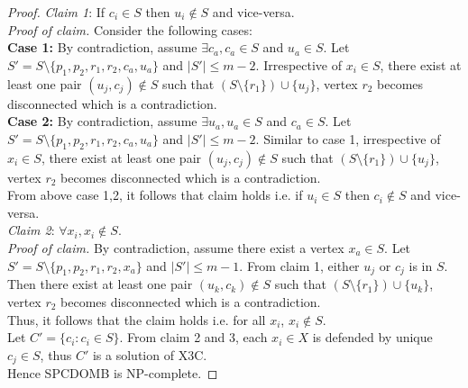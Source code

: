 \begin{theorem}
\begin{proof}
{\textit{Claim 1}:} If $c_i \in S$ then $u_i \notin S$ and vice-versa.\\
\textit{Proof of claim.} Consider the following cases:\\
\textbf{Case 1:} By contradiction, assume $\exists c_a, c_a\in S$ and $u_a \in S$. Let $S'=S \setminus \lbrace p_1,p_2,r_1,r_2,c_a,u_a \rbrace$ and $|S'| \leq m-2$. Irrespective of $x_i \in S$, there exist at least one pair $(u_j,c_j) \notin S$ such that $(S \setminus \lbrace r_1 \rbrace ) \cup \lbrace u_j \rbrace $, vertex $r_2$ becomes disconnected which is a contradiction.\\ 
\textbf{Case 2:} By contradiction, assume $\exists u_a, u_a\in S$ and $c_a \in S$. Let $S'=S \setminus \lbrace p_1,p_2,r_1,r_2,c_a,u_a \rbrace$ and $|S'| \leq m-2$. Similar to case 1, irrespective of $x_i \in S$, there exist at least one pair $(u_j,c_j) \notin S$ such that $(S \setminus \lbrace r_1 \rbrace ) \cup \lbrace u_j \rbrace $, vertex $r_2$ becomes disconnected which is a contradiction.\\ 
From above case 1,2, it follows that claim holds i.e. if $u_i\in S$ then $c_i \notin S$ and vice-versa.\\
{\textit{Claim 2}:} $\forall x_i, x_i \notin S$.\\
\textit{Proof of claim.} By contradiction, assume there exist a vertex $x_a \in S$. Let $S' = S \setminus \lbrace p_1,p_2,r_1,r_2,x_a \rbrace$ and $|S'| \leq m-1$. From claim 1, either $u_j$ or $c_j$ is in $S$. Then there exist at least one pair $(u_k,c_k) \notin S$ such that $(S \setminus \lbrace r_1 \rbrace ) \cup \lbrace u_k \rbrace $, vertex $r_2$ becomes disconnected which is a contradiction.\\ 
Thus, it follows that the claim holds i.e. for all $x_i$, $x_i \notin S$.\\
Let $C'=\lbrace c_i : c_i \in S \rbrace$. From claim 2 and 3, each $x_i \in X$ is defended by unique $c_j \in S$, thus $C'$ is a solution of X3C.\\
Hence SPCDOMB is NP-complete.
\end{proof}
\end{theorem}
